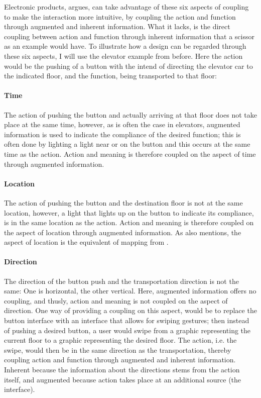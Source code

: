 Electronic products,  argues, can take advantage of these six aspects of coupling to make the interaction more intuitive, by coupling the action and function through augmented and inherent information. What it lacks, is the direct coupling between action and function through inherent information that a scissor as an example would have. To illustrate how a design can be regarded through these six aspects, I will use the elevator example from before. Here the action would be the pushing of a button with the intend of directing the elevator car to the indicated floor, and the function, being transported to that floor:
\paragraph{Time} The action of pushing the button and actually arriving at that floor does not take place at the same time, however, as is often the case in elevators, augmented information is used to indicate the compliance of the desired function; this is often done by lighting a light near or on the button and this occurs at the same time as the action. Action and meaning is therefore coupled on the aspect of time through augmented information.
\paragraph{Location} The action of pushing the button and the destination floor is not at the same location, however, a light that lights up on the button to indicate its compliance, is in the same location as the action. Action and meaning is therefore coupled on the aspect of location through augmented information. As  also mentions, the aspect of location is the equivalent of mapping from .
\paragraph{Direction} The direction of the button push and the transportation direction is not the same: One is horizontal, the other vertical. Here, augmented information offers no coupling, and thusly, action and meaning is not coupled on the aspect of direction. One way of providing a coupling on this aspect, would be to replace the button interface with an interface that allows for swiping gestures; then instead of pushing a desired button, a user would swipe from a graphic representing the current floor to a graphic representing the desired floor. The action, i.e. the swipe, would then be in the same direction as the transportation, thereby coupling action and function through augmented and inherent information. Inherent because the information about the directions stems from the action itself, and augmented because action takes place at an additional source (the interface).
